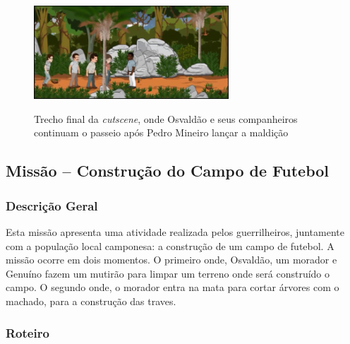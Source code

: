 \begin{figure}[H]
	\centering
	\caption{Trecho final da \textit{cutscene}, onde Osvaldão e seus companheiros continuam o passeio após Pedro Mineiro lançar a maldição}
	\includegraphics[width=0.65\textwidth]{figuras/cutscene21_fase1.png}
	\label{fig:cutscene21-fase1}
	{}
\end{figure}

\subsection{Missão -- Construção do Campo de Futebol}
\label{missao:const-campo}

\subsubsection{Descrição Geral}

Esta missão apresenta uma atividade realizada pelos guerrilheiros, juntamente com a população local camponesa: a construção de um campo de futebol. A missão ocorre em dois momentos. O primeiro onde, Osvaldão, um morador e Genuíno fazem um mutirão para limpar um terreno onde será construído o campo. O segundo onde, o morador entra na mata para cortar árvores com o machado, para a construção das traves. 

\subsubsection{Roteiro}

